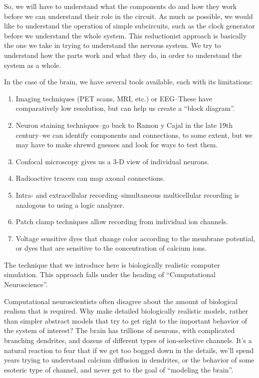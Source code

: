\documentclass[12pt]{article}
\begin{document}
So, we will have to understand what the components do and how they work before we can understand their role in the circuit. As much as possible, we would like to understand the operation of simple subcircuits, such as the clock generator before we understand the whole system. This reductionist approach is basically the one we take in trying to understand the nervous system. We try to understand how the parts work and what they do, in order to understand the system as a whole.

In the case of the brain, we have several tools available, each with its limitations:

\begin{enumerate}

\item Imaging techniques (PET scans, MRI, etc.) or EEG--These have comparatively low resolution, but can help us create a ``block diagram''.

\item Neuron staining techniques--go back to Ramon y Cajal in the late 19th century--we can identify components and connections, to some extent, but we may have to make shrewd guesses and look for ways to test them.

\item Confocal microscopy gives us a 3-D view of individual neurons.

\item Radioactive tracers can map axonal connections.
 
\item Intra- and extracellular recording--simultaneous multicellular recording is analogous to using a logic analyzer.

\item Patch clamp techniques allow recording from individual ion channels.
 
\item Voltage sensitive dyes that change color according to the membrane potential, or dyes that are sensitive to the concentration of calcium ions.

\end{enumerate}

The technique that we introduce here is biologically realistic computer simulation. This approach falls under the heading of ``Computational Neuroscience''.

Computational neuroscientists often disagree about the amount of biological realism that is required. Why make detailed biologically realistic models, rather than simpler abstract models that try to get right to the important behavior of the system of interest? The brain has trillions of neurons, with complicated branching dendrites, and dozens of different types of ion-selective channels. It's a natural reaction to fear that if we get too bogged down in the details, we'll spend years trying to understand calcium diffusion in dendrites, or the behavior of some esoteric type of channel, and never get to the goal of ``modeling the brain''.
\end{document}
